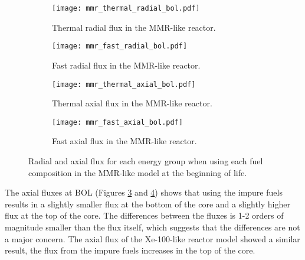 \begin{figure}
        \centering
        \begin{subfigure}[b]{0.48\textwidth}
            \centering
            \texttt{[image: mmr\_thermal\_radial\_bol.pdf]}
            \caption{Thermal radial flux in the \gls{MMR}-like reactor.}
            \label{fig:mmr_thermal_radial_bol}
        \end{subfigure}
        \hfill
        \begin{subfigure}[b]{0.48\textwidth}
            \centering
            \texttt{[image: mmr\_fast\_radial\_bol.pdf]}
            \caption{Fast radial flux in the \gls{MMR}-like reactor.}
            \label{fig:mmr_fast_radial_bol}
        \end{subfigure}
        \hfill            
        \begin{subfigure}[b]{0.48\textwidth}
            \centering
            \texttt{[image: mmr\_thermal\_axial\_bol.pdf]}
            \caption{Thermal axial flux in the \gls{MMR}-like reactor. }
            \label{fig:mmr_thermal_axial_bol}
        \end{subfigure}
        \hfill
        \begin{subfigure}[b]{0.48\textwidth}
            \centering
            \texttt{[image: mmr\_fast\_axial\_bol.pdf]}
            \caption{Fast axial flux in the \gls{MMR}-like reactor.}
            \label{fig:mmr_fast_axial_bol}
        \end{subfigure}
        \hfill
        \caption{Radial and axial flux for each energy group when using 
        each fuel composition in the \gls{MMR}-like model at the beginning 
        of life.}
        \label{fig:mmr_bol}
   \end{figure}

The axial fluxes at \gls{BOL} (Figures \ref{fig:mmr_thermal_axial_bol} and 
\ref{fig:mmr_fast_axial_bol}) shows that using the impure fuels results in 
a slightly smaller flux at the bottom of the core and a slightly higher 
flux at the top of the core. The differences between the fluxes is 
1-2 orders of magnitude smaller than the flux itself, which suggests that 
the differences are not a major concern. The axial flux of the Xe-100-like 
reactor model showed a similar result, the flux from the impure fuels 
increases in the top of the core. 

